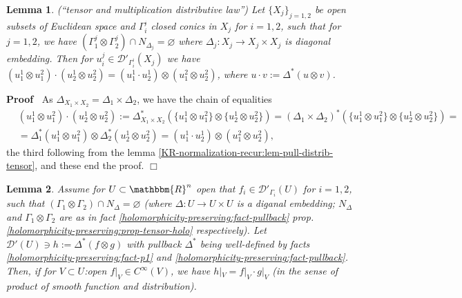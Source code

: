 \documentclass{article}
\newcommand{\assign}{:=}
\newenvironment{proof}{\noindent\textbf{Proof\ }}{\hspace*{\fill}$\Box$\medskip}
\numberwithin{definition}{section}
\newtheorem{lemma}{Lemma}
\numberwithin{lemma}{section}
\numberwithin{proposition}{section}
{\theorembodyfont{\rmfamily}\newtheorem{remark}{Remark}
\numberwithin{remark}{section}
}
\begin{document}
\begin{lemma}
  \label{KR-normalization-recur:lem-mult-distrib-tensor}(``tensor and
  multiplication distributive law'') Let $\{ X_j \}_{j = 1, 2}$ be open
  subsets of Euclidean space and $\Gamma_i^{_j}$ closed conics in $X_j$ for $i
  = 1, 2$, such that for $j = 1, 2$, we have $( \Gamma_1^j \otimes \Gamma_2^j)
  \cap N_{\Delta_j} = \varnothing$ where $\Delta_j : X_j \rightarrow X_j
  \times X_j$ is diagonal embedding. Then for $u_i^j \in
  \mathcal{D}'_{\Gamma^{_j}_i} ( X_j)$ we have $( u_1^1 \otimes u_1^2) \cdot (
  u_2^1 \otimes u_2^2) = ( u_1^1 \cdot u_2^1) \otimes ( u_1^2 \otimes u_2^2)$,
  where $u \cdot v \assign \Delta^{\ast} ( u \otimes v)$.
\end{lemma}

\begin{proof}
  As $\Delta_{X_1 \times X_2} = \Delta_1 \times \Delta_2$, we have the chain
  of equalities
  \begin{eqnarray}
    & ( u_1^1 \otimes u_1^2) \cdot ( u_2^1 \otimes u_2^2) \assign \Delta_{X_1
    \times X_2}^{\ast} ( \{ u_1^1 \otimes u_1^2 \} \otimes \{ u_2^1 \otimes
    u_2^2 \}) = ( \Delta_1^{} \times \Delta_2)^{\ast} ( \{ u_1^1 \otimes u_1^2
    \} \otimes \{ u_2^1 \otimes u_2^2 \}) = &  \nonumber\\
    & = \Delta_1^{\ast} ( u_1^1 \otimes u_1^2) \otimes \Delta_2^{\ast} (
    u_2^1 \otimes u_2^2) = ( u_1^1 \cdot u_2^1) \otimes ( u_1^2 \otimes
    u_2^2), &  \nonumber
  \end{eqnarray}
  the third following from the lemma
  \ref{KR-normalization-recur:lem-pull-distrib-tensor}, and these end the
  proof.
\end{proof}

\begin{lemma}
  \label{KR-normalization-recur:lem-mult-smth}Assume for $U \subset
  \mathbbm{R}^n$ open that $f_i \in \mathcal{D}'_{\Gamma_i} ( U)$ for $i = 1,
  2$, such that $( \Gamma_1 \otimes \Gamma_2) \cap N_{\Delta} = \varnothing$
  (where $\Delta : U \rightarrow U \times U$ is a diganal embedding;
  $N_{\Delta}$ and $\Gamma_1 \otimes \Gamma_2$ are as in fact
  \ref{holomorphicity-preserving:fact-pullback} prop.
  \ref{holomorphicity-preserving:prop-tensor-holo} respectively). Let
  $\mathcal{D}' ( U) \ni h \assign \Delta^{\ast} ( f \otimes g)$ with pullback
  $\Delta^{\ast}$ being well-defined by facts
  \ref{holomorphicity-preserving:fact-p1} and
  \ref{holomorphicity-preserving:fact-pullback}. Then, if for $V \subset
  U$:open $f |_V \in C^{\infty} ( V)$, we have $h |_V = f |_V \cdot g |_V$ (in
  the sense of product of smooth function and distribution).
\end{lemma}
\end{document}
